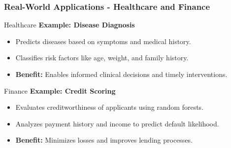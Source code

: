 \documentclass[aspectratio=169]{beamer}
\begin{document}
\begin{frame}[fragile]
    \frametitle{Real-World Applications - Healthcare and Finance}
    \begin{block}{Healthcare}
        \textbf{Example: Disease Diagnosis}
        \begin{itemize}
            \item Predicts diseases based on symptoms and medical history.
            \item Classifies risk factors like age, weight, and family history.
            \item \textbf{Benefit:} Enables informed clinical decisions and timely interventions.
        \end{itemize}
    \end{block}
    
    \begin{block}{Finance}
        \textbf{Example: Credit Scoring}
        \begin{itemize}
            \item Evaluates creditworthiness of applicants using random forests.
            \item Analyzes payment history and income to predict default likelihood.
            \item \textbf{Benefit:} Minimizes losses and improves lending processes.
        \end{itemize}
    \end{block}
\end{frame}
\end{document}
